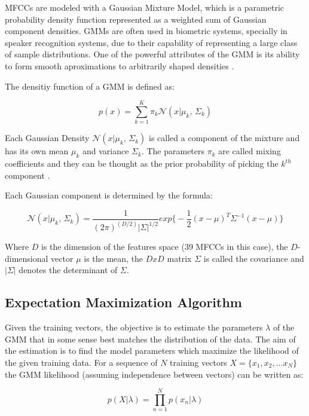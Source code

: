 MFCCs are modeled with a Gaussian Mixture Model, which is a parametric probability density
function represented as a weighted sum of Gaussian component densities. GMMs are often
used in biometric systems, specially in speaker recognition systems, due to their
capability of representing a large class of sample distributions. One of the powerful
attributes of the GMM is its ability to form smooth aproximations to arbitrarily shaped
densities \cite{gmm_reynolds}.

The densitiy function of a GMM is defined as:

\begin{equation}
	p(x) = \sum_{k=1}^{K}\pi_{k} \mathcal{N}(x|\mu_{k},\,\Sigma_{k})
\end{equation}

Each Gaussian Density $\mathcal{N}(x|\mu_{k},\,\Sigma_{k})$ is called a component of the mixture
and has its own mean $\mu_{k}$ and variance $\Sigma_{k}$. The parameters $\pi_{k}$ are called
mixing coefficients and they can be thought as the prior probability of picking the $k^{th}$
component \cite{gmm_bishop}.

Each Gaussian component is determined by the formula:

\begin{equation}
	\mathcal{N}(x|\mu_{k},\,\Sigma_{k}) = \frac{1}{(2\pi)^{(D/2)}|\Sigma|^{1/2}} exp \big\{ -\frac{1}{2}(x-\mu)^{T}\Sigma^{-1}(x-\mu)\}
\end{equation}

Where $D$ is the dimension of the features space (39 MFCCs in this case), the $D$-dimensional
vector $\mu$ is the mean, the $DxD$ matrix $\Sigma$ is called the covariance and $|\Sigma|$
denotes the determinant of $\Sigma$.

\subsection{Expectation Maximization Algorithm}

Given the training vectors, the objective is to estimate the parameters $\lambda$ of the GMM
that in some sense best matches the distribution of the data. The aim of the estimation is
to find the model parameters which maximize the likelihood of the given training data. For a
sequence of $N$ training vectors $X=\{x_{1}, x_{2}, \dotsc x_{N}\}$ the GMM likelihood
(assuming independence between vectors) can be written as:

\begin{equation}
	p(X|\lambda) = \prod_{n=1}^{N}p(x_{n}|\lambda)
	\label{eq:likelihoodGMM}
\end{equation}

